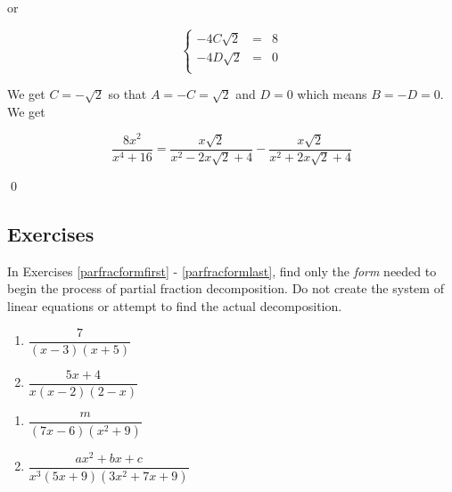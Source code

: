 \begin{ex}
\begin{enumerate}
or 

\[ \left\{ \begin{array}{rcr}  -4C\sqrt{2}& = & 8 \\ -4D\sqrt{2} & = & 0 \\ \end{array} \right.\] 

We get $C = -\sqrt{2}$ so that $A = -C = \sqrt{2}$ and $D = 0$ which means $B = -D = 0$.  We get

\[ \dfrac{8x^2}{x^4+16} = \dfrac{x\sqrt{2}}{x^2 - 2x\sqrt{2} + 4} - \dfrac{x\sqrt{2}}{x^2 + 2x\sqrt{2} + 4}\]

\qed

\end{enumerate}

\end{ex}

\newpage

\subsection{Exercises}



In Exercises \ref{parfracformfirst} - \ref{parfracformlast},  find only the \emph{form} needed to begin the process of partial fraction decomposition.  Do not create the system of linear equations or attempt to find the actual decomposition.

\begin{multicols}{2}
\begin{enumerate}

\item $\dfrac{7}{(x - 3)(x + 5)}$ \label{parfracformfirst}
\item $\dfrac{5x + 4}{x(x - 2)(2 - x)}$

\setcounter{HW}{\value{enumi}}
\end{enumerate}
\end{multicols}

\begin{multicols}{2}
\begin{enumerate}
\setcounter{enumi}{\value{HW}}


\item $\dfrac{m}{(7x - 6)(x^{2} + 9)}$
\item $\dfrac{ax^{2} + bx + c}{x^3(5x + 9)(3x^{2} + 7x + 9)}$

\setcounter{HW}{\value{enumi}}
\end{enumerate}
\end{multicols}

